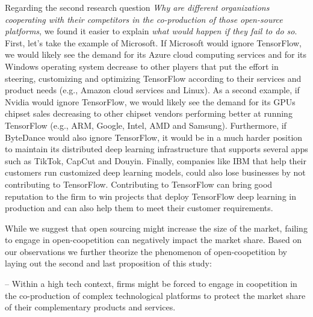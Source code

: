 \documentclass[CHICAGO,Times1COL]{WileyNJDv5} %
\begin{document}
 Regarding the second research question  \textit{Why are different organizations cooperating with their competitors in the co-production of those open-source platforms}, we found it easier to explain  \textit{what would happen if they fail to do so}.
First, let's take the example of Microsoft.  If Microsoft would ignore TensorFlow, we would likely see the demand for its Azure cloud computing services and for its Windows operating system decrease to other players that put the effort in steering, customizing and optimizing TensorFlow according to their services and product needs (e.g., Amazon cloud services and Linux). As a second example, if Nvidia would ignore TensorFlow, we would likely see the demand for its GPUs chipset sales decreasing to other chipset vendors performing better at running TensorFlow (e.g., ARM, Google, Intel, AMD and Samsung). Furthermore, if ByteDance would also ignore TensorFlow, it would be in a much harder position to maintain its distributed deep learning infrastructure that supports several apps such as TikTok, CapCut and Douyin. Finally, companies like IBM that help their customers run customized deep learning models, could also lose businesses by not contributing to TensorFlow. Contributing to TensorFlow can bring good reputation to the firm to win projects that deploy TensorFlow deep learning in production and can also help them to meet their customer requirements. 

 
 While we suggest that open sourcing might increase the size of the market, failing to engage in open-coopetition can negatively impact the market share. Based on our observations we further theorize the phenomenon of open-coopetition by laying out the second and last proposition of this study:%
 
 
 
\begin{theoreticalproposition}
\label{onTI}
-- Within a high tech context, firms might be forced to engage in coopetition in the co-production of complex technological platforms to protect the market share of their complementary products and services. 
\end{theoreticalproposition}

 
\end{document}
